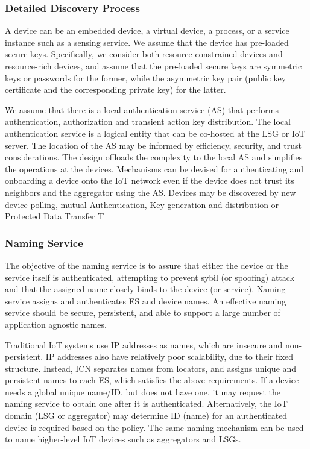 \subsubsection{Detailed Discovery Process}
A device can be an embedded device, a virtual device, a process, or a service instance such as a sensing service. We assume that the device has pre-loaded secure keys. Specifically, we consider both resource-constrained devices and resource-rich devices, and assume that the pre-loaded secure keys are symmetric keys or passwords for the former, while the asymmetric key pair (public key certificate and the corresponding private key) for the latter.\par
We assume that there is a local authentication service (AS) that performs authentication, authorization and transient action key distribution. The local authentication service is a logical entity that can be co-hosted at the LSG or IoT server. The location of the AS may be informed by efficiency, security, and trust considerations. The design offloads the complexity to the local AS and simplifies the operations at the devices. Mechanisms can be devised for authenticating and onboarding a device onto the IoT network even if the device does not trust its neighbors and the aggregator using the AS. Devices may be discovered by new device polling, mutual Authentication, Key generation and distribution or Protected Data Transfer
T
\subsubsection{Naming Service}
The objective of the naming service is to assure that either the device or the service itself is authenticated, attempting to prevent sybil (or spoofing) attack and that the assigned name closely binds to the device (or service). Naming service assigns and authenticates ES and device names. An effective naming service should be secure, persistent, and able to support a large number of application agnostic names.\par
Traditional IoT systems use IP addresses as names, which are insecure and non-persistent. IP addresses also have relatively poor scalability, due to their fixed structure. Instead, ICN separates names from locators, and assigns unique and persistent names to each ES, which satisfies the above requirements.
If a device needs a global unique name/ID, but does not have one, it may request the naming service to obtain one after it is authenticated. Alternatively, the IoT domain (LSG or aggregator) may determine ID (name) for an authenticated device is required based on the policy. The same naming mechanism can be used to name higher-level IoT devices such as aggregators and LSGs.
